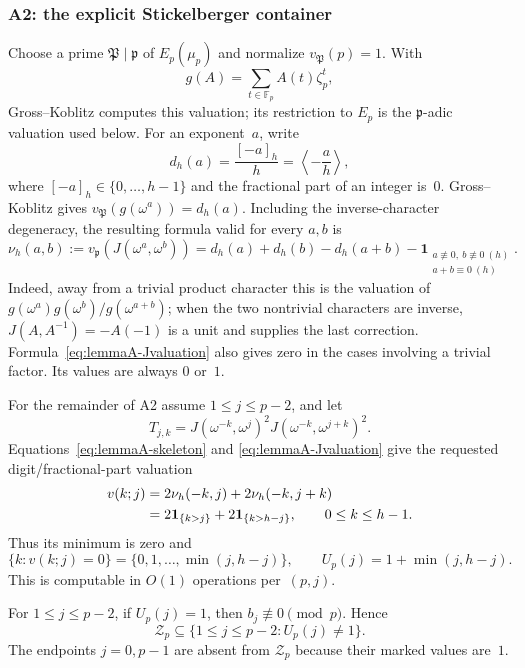 \subsubsection{A2: the explicit Stickelberger container}

Choose a prime $\mathfrak P\mid\mathfrak p$ of $E_p(\mu_p)$ and
normalize $v_{\mathfrak P}(p)=1$.  With
\[
 g(A)=\sum_{t\in\mathbb F_p}A(t)\zeta_p^t,
\]
Gross--Koblitz computes this valuation; its restriction to $E_p$ is
the $\mathfrak p$-adic valuation used below.  For an exponent~$a$,
write
\[
 d_h(a)=\frac{[-a]_h}{h}
       =\left\langle-\frac ah\right\rangle,
\]
where $[-a]_h\in\{0,\ldots,h-1\}$ and the fractional part of an
integer is~$0$.  Gross--Koblitz gives
$v_{\mathfrak P}(g(\omega^a))=d_h(a)$.  Including the inverse-character
degeneracy, the resulting formula valid for every $a,b$ is
\begin{equation}
 \nu_h(a,b):=v_{\mathfrak p}\!\left(J(\omega^a,\omega^b)\right)
 =d_h(a)+d_h(b)-d_h(a+b)
 -\mathbf1_{\substack{a\not\equiv0,\ b\not\equiv0\ (h)\\
                       a+b\equiv0\ (h)}}.
 \label{eq:lemmaA-Jvaluation}
\end{equation}
Indeed, away from a trivial product character this is the valuation of
$g(\omega^a)g(\omega^b)/g(\omega^{a+b})$; when the two nontrivial
characters are inverse, $J(A,A^{-1})=-A(-1)$ is a unit and supplies
the last correction.  Formula~\eqref{eq:lemmaA-Jvaluation} also gives
zero in the cases involving a trivial factor.  Its values are always
$0$ or~$1$.

For the remainder of A2 assume $1\leq j\leq p-2$, and let
\[
 T_{j,k}=J(\omega^{-k},\omega^j)^2
          J(\omega^{-k},\omega^{j+k})^2.
\]
Equations~\eqref{eq:lemmaA-skeleton} and
\eqref{eq:lemmaA-Jvaluation} give the requested digit/fractional-part
valuation
\begin{align}
 v(k;j)
 &=2\nu_h(-k,j)+2\nu_h(-k,j+k)\notag\\
 &=2\mathbf1_{\{k>j\}}+2\mathbf1_{\{k>h-j\}},
 \qquad 0\leq k\leq h-1.
 \label{eq:lemmaA-term-valuation}
\end{align}
Thus its minimum is zero and
\begin{equation}
 \{k:v(k;j)=0\}=\{0,1,\ldots,\min(j,h-j)\},
 \qquad
 U_p(j)=1+\min(j,h-j).
 \label{eq:lemmaA-U-explicit}
\end{equation}
This is computable in $O(1)$ operations per~$(p,j)$.

\begin{theorem}
\label{thm:lemmaA-container}
For $1\leq j\leq p-2$, if $U_p(j)=1$, then
$b_j\not\equiv0\pmod p$.  Hence
\begin{equation}
 \mathcal Z_p\subseteq
 \{1\leq j\leq p-2:U_p(j)\ne1\}.
 \label{eq:lemmaA-container}
\end{equation}
The endpoints $j=0,p-1$ are absent from $\mathcal Z_p$ because their
marked values are~$1$.
\end{theorem}

